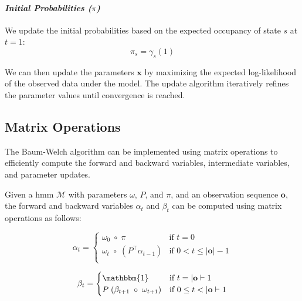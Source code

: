 \paragraph*{\textit{Initial Probabilities ($\pi$)}}

We update the initial probabilities based on the expected occupancy of state $s$ at $t = 1$:
\begin{equation}
    \pi_s = \gamma_s(1)
    \label{eq:initial-probabilities}
\end{equation}

We can then update the parameters $\mathbf{x}$ by maximizing the expected log-likelihood of the observed data under the model.
The update algorithm iteratively refines the parameter values until convergence is reached.

\subsection{Matrix Operations}\label{subsec:matrix-operations}
The Baum-Welch algorithm can be implemented using matrix operations to efficiently compute the forward and backward variables, intermediate variables, and parameter updates.

Given a \gls{hmm} $\mathcal{M}$ with parameters $\omega$, $P$, and $\pi$, and an observation sequence $\mathbf{o}$, the forward and backward variables $\alpha_t$ and $\beta_t$ can be computed using matrix operations as follows:

\begin{equation}
    \label{eq:alpha}
    \alpha_t =
    \begin{cases}
        \omega_0 \; \circ \; \pi   & \text{if } t = 0    \\
        \omega_t \; \circ \; \left( {P}^\top \alpha_{t - 1} \right)   & \text{if } 0 < t \leq |\mathbf{o}|-1 \\
    \end{cases}
\end{equation}


\begin{equation}
    \label{eq:beta}
    {\beta}_t =
    \begin{cases}
        \mathbbm{1} & \text{if } t = |\mathbf{o}|-1        \\
        {P} \; ({\beta}_{t + 1} \; \circ \; {\omega}_{t + 1}) & \text{if } 0 \leq t < |\mathbf{o}|-1 \\
    \end{cases}
\end{equation}

